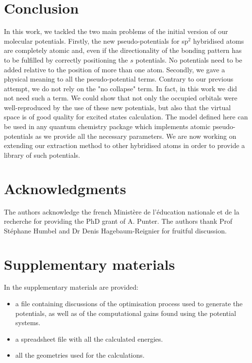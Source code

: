 \documentclass[aip]{revtex4-1}
\begin{document}
\section{Conclusion}
In this work, we tackled the two main problems of the initial version of our
molecular potentials.
Firstly, the new pseudo-potentials for sp$^2$ hybridised
atoms are completely atomic and, even if the directionality of the bonding pattern
has to be fulfilled by correctly positioning the \(s\) potentials. No potentials need to
be added relative to the position of more than one atom.
Secondly, we gave a physical meaning to all the pseudo-potential
terms.
Contrary to our previous attempt, we do not rely on the "no collapse" term.
In fact, in this work we did not need such a term.
We could show that not only the occupied orbitals were well-reproduced
by the use of these new potentials, but also that the virtual space is of good quality
for excited states calculation.
The model defined here can be used in any quantum chemistry package which
implements atomic pseudo-potentials as we provide all the necessary parameters.
We are now working on extending our extraction method to other hybridised atoms
in order to provide a library of such potentials.

\section{Acknowledgments}
The authors acknowledge the french Minist\`ere de l'\'education
nationale et de la recherche for providing the PhD grant of A. Punter. The authors thank Prof St\'ephane Humbel and Dr Denis Hagebaum-Reignier for fruitful discussion.

\section{Supplementary materials}
In the supplementary materials are provided:
\begin{itemize}
\item a file containing discussions of the optimisation process used to generate the potentials, as well as of the computational gains found using the potential systems.
\item a spreadsheet file with all the calculated energies.
\item all the geometries used for the calculations.
\end{itemize}

\end{document}
